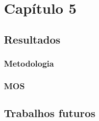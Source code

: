 
\chapter{Capítulo 5}

\section{Resultados}
\subsection{Metodologia}
\subsection{MOS}

\section{Trabalhos futuros}

% 
% 
